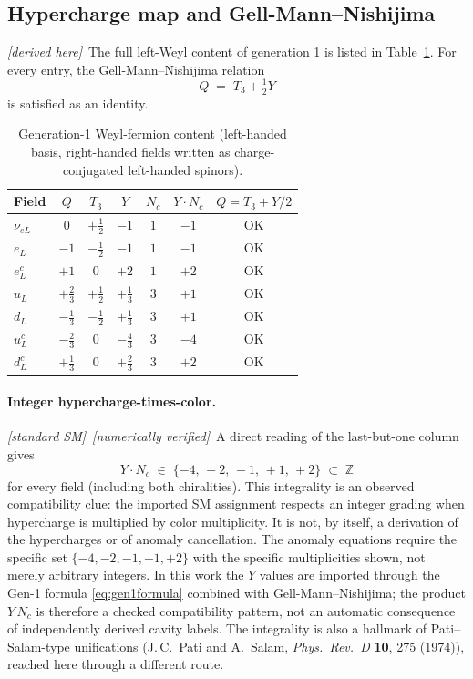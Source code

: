 \documentclass[11pt]{article}
\newcommand{\derived}{\textit{[derived here]}}
\newcommand{\fromSM}{\textit{[standard SM]}}
\newcommand{\numerical}{\textit{[numerically verified]}}
\begin{document}
\subsection{Hypercharge map and Gell-Mann--Nishijima}
\label{sec:phaseC_T3Y}

\derived\ The full left-Weyl content of generation 1 is listed in
Table~\ref{tab:gen1}. For every entry, the Gell-Mann--Nishijima
relation
\begin{equation}
  \label{eq:GMN}
  Q \;=\; T_3 + \tfrac{1}{2}Y
\end{equation}
is satisfied as an identity.

\begin{table}[h]
\centering
\caption{Generation-1 Weyl-fermion content (left-handed basis,
right-handed fields written as charge-conjugated left-handed
spinors).}
\label{tab:gen1}
\begin{tabular}{lcccccc}
\toprule
Field & $Q$ & $T_3$ & $Y$ & $N_c$ & $Y\cdot N_c$ & $Q=T_3+Y/2$\\
\midrule
$\nu_{eL}$ &   $0$  & $+\tfrac12$ & $-1$ & $1$ & $-1$ & OK\\
$e_L$      &  $-1$  & $-\tfrac12$ & $-1$ & $1$ & $-1$ & OK\\
$e_L^c$    &  $+1$  & $0$         & $+2$ & $1$ & $+2$ & OK\\
$u_L$      & $+\tfrac23$ & $+\tfrac12$ & $+\tfrac13$ & $3$ & $+1$ & OK\\
$d_L$      & $-\tfrac13$ & $-\tfrac12$ & $+\tfrac13$ & $3$ & $+1$ & OK\\
$u_L^c$    & $-\tfrac23$ & $0$         & $-\tfrac43$ & $3$ & $-4$ & OK\\
$d_L^c$    & $+\tfrac13$ & $0$         & $+\tfrac23$ & $3$ & $+2$ & OK\\
\bottomrule
\end{tabular}
\end{table}

\paragraph{Integer hypercharge-times-color.} \fromSM\ \numerical\ A direct
reading of the last-but-one column gives
\begin{equation}
  \label{eq:YNc_integer}
  Y\cdot N_c \;\in\; \{-4,\,-2,\,-1,\,+1,\,+2\}\;\subset\;\mathbb{Z}
\end{equation}
for every field (including both chiralities). This integrality
is an observed compatibility clue: the imported SM assignment
respects an integer grading when hypercharge is multiplied by
color multiplicity. It is not, by itself, a derivation of the
hypercharges or of anomaly cancellation. The anomaly equations
require the specific set $\{-4,-2,-1,+1,+2\}$ with the specific
multiplicities shown, not merely arbitrary integers. In this
work the $Y$ values are imported through the Gen-1 formula
\eqref{eq:gen1formula} combined with Gell-Mann--Nishijima; the
product $Y\,N_c$ is therefore a checked compatibility pattern,
not an automatic consequence of independently derived cavity
labels. The integrality is also a hallmark of
Pati--Salam-type unifications
(J.\,C.~Pati and A.~Salam, \emph{Phys.\ Rev.\ D} \textbf{10},
275 (1974)), reached here through a different route.
\end{document}
